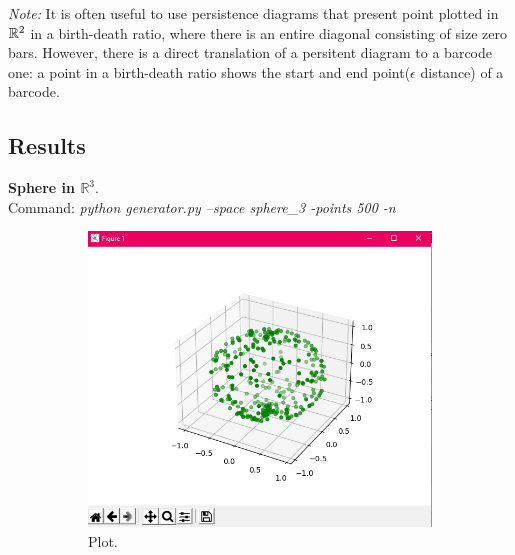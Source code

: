\documentclass[11pt,a4paper]{report}
\begin{document}
            
            \emph{Note:} It is often useful to use persistence diagrams that present point plotted in $\mathbb{R}^2$ in a birth-death ratio, where there is an entire diagonal consisting of size zero bars. However, there is a direct translation of a persitent diagram to a barcode one: a point in a birth-death ratio shows the start and end point($\epsilon$ distance) of a barcode.
            
            \subsection*{Results}
            \textbf{Sphere in $\mathbb{R}^3$}.\\
              Command: \textit{python generator.py --space sphere\_3 -points 500 -n}

              \begin{figure}[H]
                \centering
                \begin{subfigure}[b]{0.45\linewidth}
                  \includegraphics[width=\linewidth]{./ripser/on_sphere.PNG}
                  \caption{Plot.}
                \end{subfigure}
                \begin{subfigure}[b]{0.45\linewidth}

\end{subfigure}
\end{figure}
\end{document}
